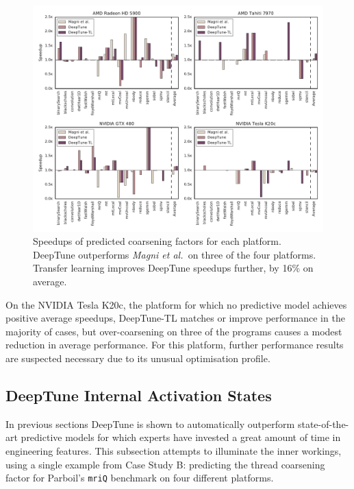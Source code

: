 \begin{figure}
  \centering %
  \includegraphics[width=\textwidth]{img/pact-speedup}%
  \caption[Speedups of predicted thread coarsening factors]{%
    Speedups of predicted coarsening factors for each platform. DeepTune outperforms \emph{Magni et al.\ }on three of the four platforms. Transfer learning improves DeepTune speedups further, by 16\% on average.%
  }%
  \label{fig:pact-speedup}
\end{figure}

On the NVIDIA Tesla K20c, the platform for which no predictive model achieves positive average speedups, DeepTune-TL matches or improve performance in the majority of cases, but over-coarsening on three of the programs causes a modest reduction in average performance. For this platform, further performance results are suspected necessary due to its unusual optimisation profile.


\subsection{DeepTune Internal Activation States}
\label{subsec:deeptune-internal-states}

In previous sections DeepTune is shown to automatically outperform state-of-the-art predictive models for which experts have invested a great amount of time in engineering features. This subsection attempts to illuminate the inner workings, using a single example from Case Study B: predicting the thread coarsening factor for Parboil's \texttt{mriQ} benchmark on four different platforms.

